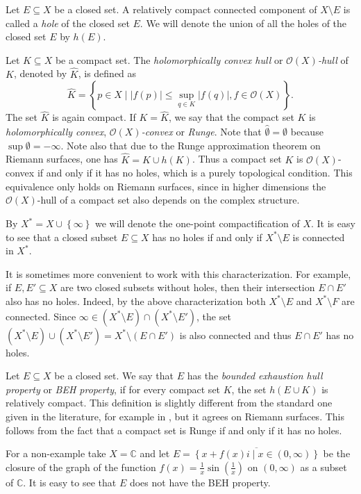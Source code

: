 \documentclass[a4paper,11pt]{amsart}
\newcommand{\C}{\mathbb C}
\newcommand{\set}[1]{\left\{#1\right\}}
\newcommand{\abs}[1]{\left|#1\right|}
\begin{document}
Let $E \subseteq X$ be a closed set. 
A relatively compact connected component of $X \setminus E$ is called a \emph{hole} of the closed set $E$.
We will denote the union of all the holes of the closed set $E$ by $h(E)$. 

Let $K \subseteq X$ be a compact set. 
The \emph{holomorphically convex hull} or \emph{$\mathcal{O}(X)$-hull} of $K$, denoted by $\widehat{K}$, is defined as 
\[\widehat{K} = \set{p \in X \mid \abs{f(p)} \le \sup_{q \in K}\abs{f(q)}, f \in \mathcal{O}(X)}.\]
The set $\widehat{K}$ is again compact.
If $K = \widehat{K}$, we say that the compact set $K$ is \emph{holomorphically convex}, \emph{$\mathcal{O}(X)$-convex} or \emph{Runge}.
Note that $\widehat{\emptyset} = \emptyset$ because $\sup \emptyset = - \infty$.
Note also that due to the Runge approximation theorem on Riemann surfaces, one has $\widehat{K} = K \cup h(K)$.
Thus a compact set $K$ is $\mathcal{O}(X)$-convex if and only if it has no holes, which is a purely topological condition.
This equivalence only holds on Riemann surfaces, since in higher dimensions the $\mathcal{O}(X)$-hull of a compact set also depends on the complex structure.

By $X^* = X \cup \set{\infty}$ we will denote the one-point compactification of $X$.
It is easy to see that a closed subset $E \subseteq X$ has no holes if and only if $X^* \setminus E$ is connected in $X^*$.

It is sometimes more convenient to work with this characterization.
For example, if $E, E' \subseteq X$ are two closed subsets without holes, then their intersection $E \cap E'$ also has no holes. 
Indeed, by the above characterization both $X^*\setminus E$ and $X^*\setminus F$ are connected.
Since $\infty \in (X^*\setminus E) \cap (X^*\setminus E')$, the set $(X^*\setminus E) \cup (X^*\setminus E') = X^* \setminus (E \cap E')$ is also connected and thus $E \cap E'$ has no holes.

Let $E \subseteq X$ be a closed set. We say that $E$ has the \emph{bounded exhaustion hull property} or \emph{BEH property},
if for every compact set $K$, the set $h(E \cup K)$ is relatively compact. 
This definition is slightly different from the standard one given in the literature, for example in \cite[168]{MinimalSurfacesFromAnalyticPOV},
but it agrees on Riemann surfaces. This follows from the fact that a compact set is Runge if and only if it has no holes.

For a non-example take $X = \C$ and let $E = \overline{\set{x + f(x)i \mid x \in (0,\infty)}}$ be the closure of the graph of the function $f(x) = \frac{1}{x}\sin\left(\frac{1}{x}\right)$ on $(0,\infty)$ as a subset of $\C$. 
It is easy to see that $E$ does not have the BEH property.
\end{document}
